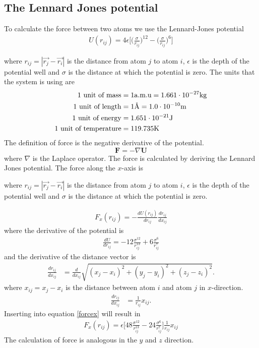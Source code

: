 \documentclass{article}
\begin{document}
\subsection{The Lennard Jones potential}

To calculate the force between two atoms we use the Lennard-Jones potential
\begin{align}
	U(r_{ij})=4\epsilon\Big[\Big(\frac{\sigma}{r_{ij}}\Big)^{12}-\Big(\frac{\sigma}{r_{ij}}\Big)^{6}\Big]
\end{align}

where $r_{ij}=|\vec{r_j}-\vec{r_i}|$ is the distance from atom $j$ to atom $i$, $\epsilon$ is the depth of the potential well and $\sigma$ is the distance at which the potential is zero. The units that the system is using are
\begin{align*}
	1 \textnormal{ unit of mass} &= 1 \textnormal{a.m.u} = 1.661\cdot 10^{-27} \textnormal{kg}\\
	1 \textnormal{ unit of length} &= 1 \textnormal{Å} = 1.0\cdot 10^{-10} \textnormal{m}\\
	1 \textnormal{ unit of energy} &= 1.651\cdot 10^{-21}\textnormal{J}\\
	1 \textnormal{ unit of temperature} &= 119.735\textnormal{K}
\end{align*}
The definition of force is the negative derivative of the potential.
$$\mathbf{F}=-\nabla \mathbf{U}$$
where $\nabla$ is the Laplace operator.
The force is calculated by deriving the Lennard Jones potential. The force along the $x$-axis is

where $r_{ij}=|\vec{r_j}-\vec{r_i}|$ is the distance from atom $j$ to atom $i$, $\epsilon$ is the depth of the potential well and $\sigma$ is the distance at which the potential is zero.

\begin{align}
	F_x(r_{ij}) = - \frac{dU(r_{ij})}{dr_{ij}}\frac{dr_{ij}}{dx_{ij}}
	\label{forcex}
\end{align}
where the derivative of the potential is
\begin{align}
	\frac{dU}{dr_{ij}}=-12\frac{\sigma^{12}}{r_{ij}^{13}} + 6 \frac{\sigma^6}{r_{ij}^7}
\end{align}
and the derivative of the distance vector is
\begin{align}
	\frac{dr_{ij}}{dx_{ij}}&=\frac{d}{dx_{ij}}\sqrt{(x_j-x_i)^2+(y_j-y_i)^2+(z_j-z_i)^2}.
\end{align}
where $x_{ij}=x_j-x_i$ is the distance between atom $i$ and atom $j$ in $x$-direction.
\begin{align}
	\frac{dr_{ij}}{dx_{ij}}&=\frac{1}{r_{ij}}x_{ij}.
\end{align}
Inserting into equation \ref{forcex} will result in
\begin{align}
	F_x(r_{ij})= \epsilon \Big[48\frac{\sigma^{12}}{r_{ij}^{13}} - 24 \frac{\sigma^6}{r_{ij}^7}\Big]\frac{1}{r_{ij}}x_{ij}
\end{align}
The calculation of force is analogous in the $y$ and $z$ direction.
\end{document}
